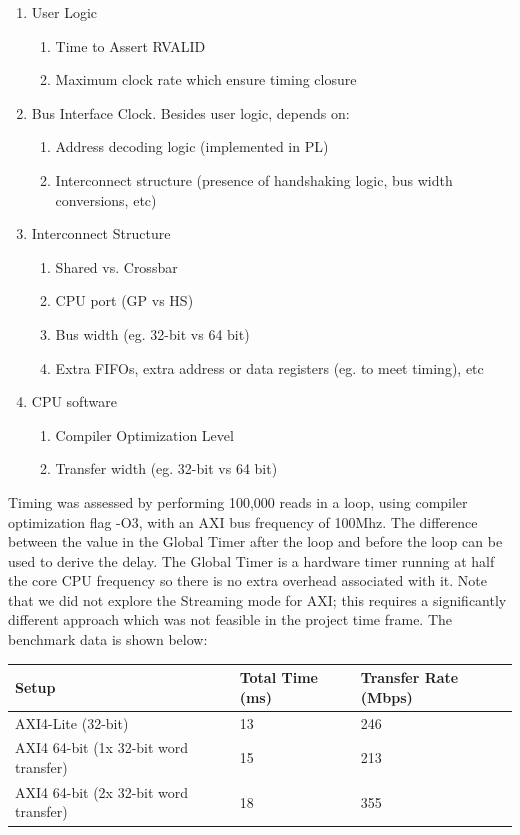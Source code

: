 \documentclass[journal]{IEEEtran}
\begin{document}
\begin{enumerate}
  \item User Logic
  \begin{enumerate}
    \item Time to Assert RVALID
    \item Maximum clock rate which ensure timing closure
  \end{enumerate}
  \item Bus Interface Clock. Besides user logic, depends on: 
  \begin{enumerate}
    \item Address decoding logic (implemented in PL) 
   \item  Interconnect structure (presence of handshaking logic, bus width conversions, etc)
  \end{enumerate}
  \item Interconnect Structure 
 \begin{enumerate}
    \item Shared vs. Crossbar
    \item CPU port (GP vs HS)
    \item Bus width (eg. 32-bit vs 64 bit)
    \item Extra FIFOs, extra address or data registers (eg. to meet timing), etc
  \end{enumerate}
  \item CPU software
 \begin{enumerate}
    \item Compiler Optimization Level
    \item Transfer width (eg. 32-bit vs 64 bit) 
  \end{enumerate}
\end{enumerate}

Timing was assessed by performing 100,000 reads in a loop, using compiler optimization flag -O3, with an AXI bus frequency of 100Mhz. The difference  between the value in the Global Timer after the loop and before the loop can be used to derive the delay. The Global Timer is a hardware timer running at half the core CPU frequency so there is no extra overhead associated with it. Note that we did not explore the Streaming mode for AXI; this requires a significantly different approach which was not feasible in the project time frame. The benchmark data is shown below:

\begin{table}[h]
\begin{tabular}{@{}lll@{}}
\toprule
Setup                                 & Total Time (ms) & Transfer Rate (Mbps) \\ \midrule
AXI4-Lite (32-bit)                    & 13              & 246                             \\
AXI4 64-bit (1x 32-bit word transfer) & 15              & 213                             \\
AXI4 64-bit (2x 32-bit word transfer) & 18              & 355                             \\ \bottomrule
\end{tabular}
\end{table}
\end{document}
